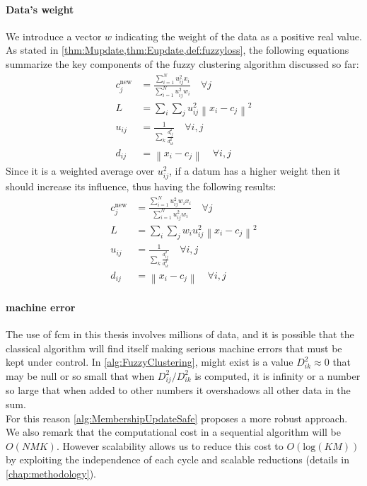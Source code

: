 \paragraph{Data's weight}
We introduce a vector $w$ indicating the weight of the data as a positive real value. As stated in \cref{thm:Mupdate,thm:Eupdate,def:fuzzyloss}, the following equations summarize the key components of the fuzzy clustering algorithm discussed so far:
\begin{align*}
	c_{j}^\text{new} &= \frac{\sum_{i=1}^N u_{ij}^2x_i}{\sum_{i=1}^N u_{ij}^2w_i} \quad \forall j\\
	L &= \sum_i\sum_j u_{ij}^2\left\|x_i-c_j\right\|^2 \\
	u_{ij} &= \frac{1}{\sum_k\frac{d_{ij}^2}{d_{ik}^2}} \quad \forall i,j\\
	d_{ij} &= \left\|x_i - c_{j}\right\| \quad \forall i,j
\end{align*}
Since it is a weighted average over $u_{ij}^2$, if a datum has a higher weight then it should increase its influence, thus having the following results:
\begin{align*}
	c_{j}^\text{new} &= \frac{\sum_{i=1}^N u_{ij}^2w_ix_i}{\sum_{i=1}^N u_{ij}^2w_i} \quad \forall j\\
	L &= \sum_i\sum_j w_{i}u_{ij}^2\left\|x_i-c_j\right\|^2 \\
	u_{ij} &= \frac{1}{\sum_k\frac{d_{ij}^2}{d_{ik}^2}} \quad \forall i,j\\
	d_{ij} &= \left\|x_i - c_{j}\right\| \quad \forall i,j
\end{align*}

\paragraph{machine error}
The use of \gls{fcm} in this thesis involves millions of data, and it is possible that the classical algorithm will find itself making serious machine errors that must be kept under control. In \cref{alg:FuzzyClustering}, might exist is a value $D_{ik}^2 \approx 0$  that may be null or so small that when $D_{ij}^2 / D_{ik}^2$ is computed, it is infinity or a number so large that when added to other numbers it overshadows all other data in the sum.\\ For this reason \cref{alg:MembershipUpdateSafe} proposes a more robust approach. We also remark that the computational cost in a sequential algorithm will be $O(NMK)$. However scalability allows us to reduce this cost to $O(\text{log}(KM))$ by exploiting the independence of each cycle and scalable reductions (details in \cref{chap:methodology}).\\

